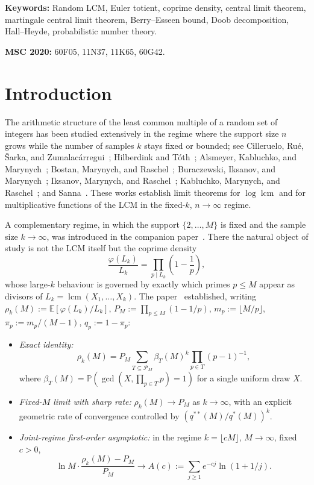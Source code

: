 \documentclass[11pt]{article}
\theoremstyle{remark}
\newcommand{\lcm}{\operatorname{lcm}}
\newcommand{\gcdop}{\operatorname{gcd}}
\newcommand{\PP}{\mathbb{P}}
\newcommand{\EE}{\mathbb{E}}
\newcommand{\PM}{\mathcal{P}_M}
\begin{document}
\noindent\textbf{Keywords:} Random LCM, Euler totient, coprime density, central limit theorem, martingale central limit theorem, Berry--Esseen bound, Doob decomposition, Hall--Heyde, probabilistic number theory.

\noindent\textbf{MSC 2020:} 60F05, 11N37, 11K65, 60G42.

\section{Introduction}\label{sec:intro}

The arithmetic structure of the least common multiple of a random set of integers has been studied extensively in the regime where the support size $n$ grows while the number of samples $k$ stays fixed or bounded; see Cilleruelo, Ru\'e, \v{S}arka, and Zumalac\'arregui~\cite{CRSZ}; Hilberdink and T\'oth~\cite{HT}; Alsmeyer, Kabluchko, and Marynych~\cite{AKM}; Bostan, Marynych, and Raschel~\cite{BMR}; Buraczewski, Iksanov, and Marynych~\cite{BIM}; Iksanov, Marynych, and Raschel~\cite{IMR}; Kabluchko, Marynych, and Raschel~\cite{KMR}; and Sanna~\cite{Sanna}. These works establish limit theorems for $\log \lcm$ and for multiplicative functions of the LCM in the fixed-$k$, $n \to \infty$ regime.

A complementary regime, in which the support $\{2, \ldots, M\}$ is fixed and the sample size $k \to \infty$, was introduced in the companion paper~\cite{wakid1}. There the natural object of study is not the LCM itself but the coprime density
\[
\frac{\varphi(L_k)}{L_k} = \prod_{p \mid L_k}\!\left(1 - \frac{1}{p}\right),
\]
whose large-$k$ behaviour is governed by exactly which primes $p \leq M$ appear as divisors of $L_k = \lcm(X_1, \ldots, X_k)$. The paper~\cite{wakid1} established, writing $\rho_k(M) := \EE[\varphi(L_k)/L_k]$, $P_M := \prod_{p \leq M}(1 - 1/p)$, $m_p := \lfloor M/p \rfloor$, $\pi_p := m_p/(M-1)$, $q_p := 1 - \pi_p$:
\begin{itemize}[leftmargin=2em]\itemsep=2pt
\item \emph{Exact identity:}
\[
\rho_k(M)=P_M\sum_{T\subseteq\PM}\beta_T(M)^k
\prod_{p\in T}(p-1)^{-1},
\]
where $\beta_T(M)=\PP(\gcdop(X,\prod_{p\in T}p)=1)$ for a single uniform draw $X$.
\item \emph{Fixed-$M$ limit with sharp rate:} $\rho_k(M) \to P_M$ as $k \to \infty$, with an explicit geometric rate of convergence controlled by $(q^{**}(M)/q^*(M))^k$.
\item \emph{Joint-regime first-order asymptotic:} in the regime $k = \lfloor cM \rfloor$, $M \to \infty$, fixed $c > 0$,
\[
\ln M \cdot \frac{\rho_k(M) - P_M}{P_M} \longrightarrow A(c) := \sum_{j \geq 1} e^{-cj}\ln(1 + 1/j).
\]
\end{itemize}
\end{document}
